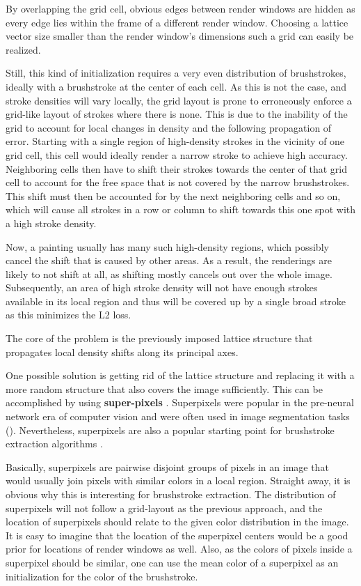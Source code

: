 By overlapping the grid cell, obvious edges between render windows are hidden as every edge lies within the frame of a different render window.
Choosing a lattice vector size smaller than the render window's dimensions such a grid can easily be realized.

Still, this kind of initialization requires a very even distribution of brushstrokes, ideally with a brushstroke at the center of each cell.
As this is not the case, and stroke densities will vary locally, the grid layout is prone to erroneously enforce a grid-like layout of strokes where there is none.
This is due to the inability of the grid to account for local changes in density and the following propagation of error.
Starting with a single region of high-density strokes in the vicinity of one grid cell, this cell would ideally render a narrow stroke to achieve high accuracy.
Neighboring cells then have to shift their strokes towards the center of that grid cell to account for the free space that is not covered by the narrow brushstrokes.
This shift must then be accounted for by the next neighboring cells and so on, which will cause all strokes in a row or column to shift towards this one spot with a high stroke density.

Now, a painting usually has many such high-density regions, which possibly cancel the shift that is caused by other areas.
As a result, the renderings are likely to not shift at all, as shifting mostly cancels out over the whole image.
Subsequently, an area of high stroke density will not have enough strokes available in its local region and thus will be covered up by a single broad stroke as this minimizes the L2 loss.

The core of the problem is the previously imposed lattice structure that propagates local density shifts along its principal axes.

One possible solution is getting rid of the lattice structure and replacing it with a more random structure that also covers the image sufficiently.
This can be accomplished by using \textbf{super-pixels} \cite{superpixels}.
Superpixels were popular in the pre-neural network era of computer vision and were often used in image segmentation tasks (\cite{img segmentation with SP}).
Nevertheless, superpixels are also a popular starting point for brushstroke extraction algorithms \cite{brushs stroke extraction}.

Basically, superpixels are pairwise disjoint groups of pixels in an image that would usually join pixels with similar colors in a local region.
Straight away, it is obvious why this is interesting for brushstroke extraction.
The distribution of superpixels will not follow a grid-layout as the previous approach, and the location of superpixels should relate to the given color distribution in the image.
It is easy to imagine that the location of the superpixel centers would be a good prior for locations of render windows as well.
Also, as the colors of pixels inside a superpixel should be similar, one can use the mean color of a superpixel as an initialization for the color of the brushstroke.

